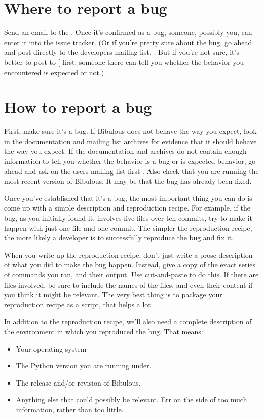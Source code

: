 \documentclass[letterpaper,10pt,english]{sphinxmanual}
\begin{document}
\section{Where to report a bug}
\label{instructions_for_reporting_bugs:where-to-report-a-bug}
Send an email to the . Once it's confirmed as a bug, someone, possibly you, can enter it into the issue tracker. (Or if you're pretty sure about the bug, go ahead and post directly to the developers mailing list, . But if you're not sure, it's better to post to {[}\code{users mailing list}{]} first; someone there can tell you whether the behavior you encountered is expected or not.)


\section{How to report a bug}
\label{instructions_for_reporting_bugs:how-to-report-a-bug}
First, make sure it's a bug. If Bibulous does not behave the way you expect, look in the documentation and mailing list archives for evidence that it should behave the way you expect. If the documentation and archives do not contain enough information to tell you whether the behavior is a bug or is expected behavior, go ahead and ask on the users mailing list first . Also check that you are running the most recent version of Bibulous. It may be that the bug has already been fixed.

Once you've established that it's a bug, the most important thing you can do is come up with a simple description and reproduction recipe. For example, if the bug, as you initially found it, involves five files over ten commits, try to make it happen with just one file and one commit. The simpler the reproduction recipe, the more likely a developer is to successfully reproduce the bug and fix it.

When you write up the reproduction recipe, don't just write a prose description of what you did to make the bug happen. Instead, give a copy of the exact series of commands you ran, and their output. Use cut-and-paste to do this. If there are files involved, be sure to include the names of the files, and even their content if you think it might be relevant. The very best thing is to package your reproduction recipe as a script, that helps a lot.

In addition to the reproduction recipe, we'll also need a complete description of the environment in which you reproduced the bug. That means:
\begin{itemize}
\item {} 
Your operating system

\item {} 
The Python version you are running under.

\item {} 
The release and/or revision of Bibulous.

\item {} 
Anything else that could possibly be relevant. Err on the side of too much information, rather than too little.

\end{itemize}
\end{document}
